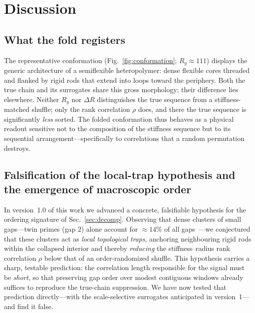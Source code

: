 \documentclass[11pt]{article}
\begin{document}
\section{Discussion}

\subsection{What the fold registers}
The representative conformation (Fig.~\ref{fig:conformation}; $R_g \approx 111$)
displays the generic architecture of a semiflexible heteropolymer: dense flexible
cores threaded and flanked by rigid rods that extend into loops toward the periphery.
Both the true chain and its surrogates share this gross morphology; their difference
lies elsewhere. Neither $R_g$ nor $\Delta R$ distinguishes the true sequence from a
stiffness-matched shuffle; only the rank correlation $\rho$ does, and there the true
sequence is significantly \emph{less} sorted. The folded conformation thus behaves as
a physical readout sensitive not to the composition of the stiffness sequence but to
its sequential arrangement---specifically to correlations that a random permutation
destroys.

\subsection{Falsification of the local-trap hypothesis and the emergence of
macroscopic order}
\label{sec:scissors}

In version~1.0 of this work we advanced a concrete, falsifiable hypothesis for the
ordering signature of Sec.~\ref{sec:decomp}. Observing that dense clusters of small
gaps---twin primes (gap $2$) alone account for ${\approx}14\%$ of all
gaps~\cite{HardyLittlewood}---we conjectured that these clusters act as \emph{local
topological traps}, anchoring neighbouring rigid rods within the collapsed interior
and thereby \emph{reducing} the stiffness--radius rank correlation $\rho$ below that
of an order-randomized shuffle. This hypothesis carries a sharp, testable prediction:
the correlation length responsible for the signal must be \emph{short}, so that
preserving gap order over modest contiguous windows already suffices to reproduce the
true-chain suppression. We have now tested that prediction directly---with the
scale-selective surrogates anticipated in version~1---and find it false.
\end{document}
